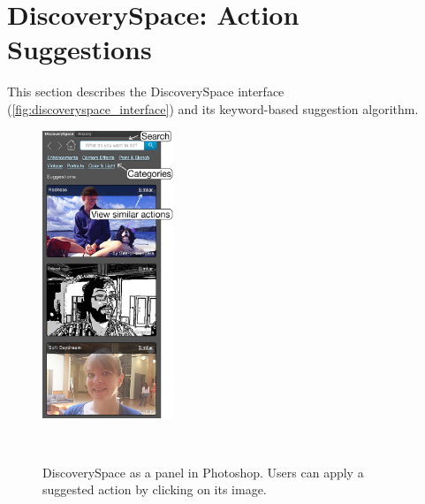 \section{DiscoverySpace: Action Suggestions}
This section describes the Discovery\-Space interface (\autoref{fig:discoveryspace_interface}) and its keyword-based suggestion algorithm.

\begin{figure}[b!]
\centering
  \includegraphics[width=0.35\textwidth]{discoveryspace/figures/discoveryspace_with_labels.png}
  \caption{DiscoverySpace as a panel in Photoshop. Users can apply a suggested action by clicking on its image.}~\label{fig:discoveryspace_interface}
\end{figure}


